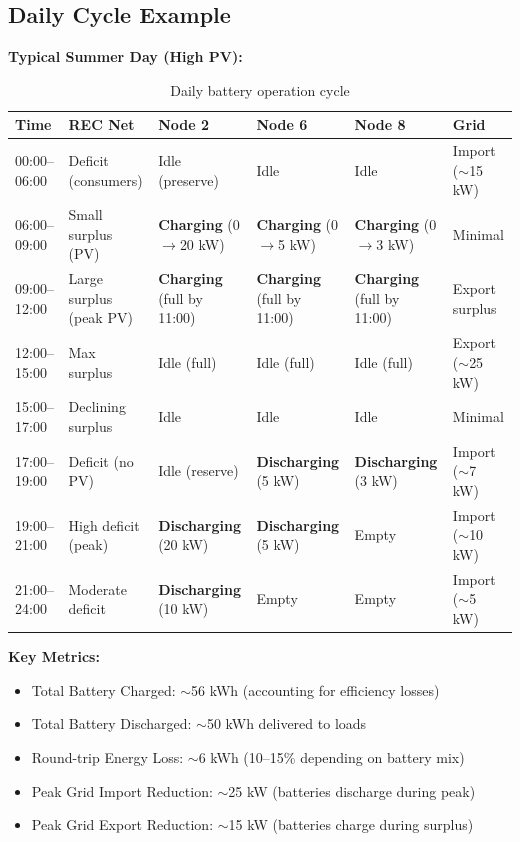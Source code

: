 \documentclass[11pt,a4paper]{article}
\begin{document}
\subsection{Daily Cycle Example}

\textbf{Typical Summer Day (High PV):}

\begin{table}[h]
\centering
\tiny
\begin{tabular}{@{}p{2.5cm}p{2.5cm}p{2cm}p{2cm}p{2cm}p{2cm}@{}}
\toprule
\textbf{Time} & \textbf{REC Net} & \textbf{Node 2} & \textbf{Node 6} & \textbf{Node 8} & \textbf{Grid} \\ 
\midrule
00:00--06:00 & Deficit (consumers) & Idle (preserve) & Idle & Idle & Import ($\sim$15 kW) \\
06:00--09:00 & Small surplus (PV) & \textbf{Charging} (0$\to$20 kW) & \textbf{Charging} (0$\to$5 kW) & \textbf{Charging} (0$\to$3 kW) & Minimal \\
09:00--12:00 & Large surplus (peak PV) & \textbf{Charging} (full by 11:00) & \textbf{Charging} (full by 11:00) & \textbf{Charging} (full by 11:00) & Export surplus \\
12:00--15:00 & Max surplus & Idle (full) & Idle (full) & Idle (full) & Export ($\sim$25 kW) \\
15:00--17:00 & Declining surplus & Idle & Idle & Idle & Minimal \\
17:00--19:00 & Deficit (no PV) & Idle (reserve) & \textbf{Discharging} (5 kW) & \textbf{Discharging} (3 kW) & Import ($\sim$7 kW) \\
19:00--21:00 & High deficit (peak) & \textbf{Discharging} (20 kW) & \textbf{Discharging} (5 kW) & Empty & Import ($\sim$10 kW) \\
21:00--24:00 & Moderate deficit & \textbf{Discharging} (10 kW) & Empty & Empty & Import ($\sim$5 kW) \\
\bottomrule
\end{tabular}
\caption{Daily battery operation cycle}
\end{table}

\textbf{Key Metrics:}
\begin{itemize}
    \item Total Battery Charged: $\sim$56 kWh (accounting for efficiency losses)
    \item Total Battery Discharged: $\sim$50 kWh delivered to loads
    \item Round-trip Energy Loss: $\sim$6 kWh (10--15\% depending on battery mix)
    \item Peak Grid Import Reduction: $\sim$25 kW (batteries discharge during peak)
    \item Peak Grid Export Reduction: $\sim$15 kW (batteries charge during surplus)
\end{itemize}
\end{document}
